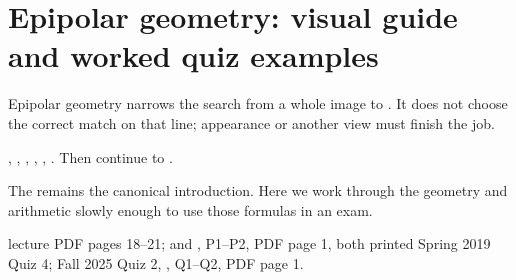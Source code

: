 \documentclass[letterpaper,11pt,english,openany,oneside]{jupyterBook}
\begin{document}
\sphinxstepscope


\section{Epipolar geometry: visual guide and worked quiz examples}
\label{\detokenize{lectures/lecture04/epipolar-practice:epipolar-geometry-visual-guide-and-worked-quiz-examples}}\label{\detokenize{lectures/lecture04/epipolar-practice:lec04-epipolar-practice}}\label{\detokenize{lectures/lecture04/epipolar-practice::doc}}
\sphinxAtStartPar
{} Epipolar geometry narrows the search from a whole image to . It does not choose the correct match on that line; appearance or another view must finish the job.

\sphinxAtStartPar
{} {\hyperref[\detokenize{lectures/lecture04/epipolar-practice:epipolar-point-line}]{}}, {\hyperref[\detokenize{lectures/lecture04/epipolar-practice:epipolar-test-match}]{}}, {\hyperref[\detokenize{lectures/lecture04/epipolar-practice:epipolar-reverse}]{}}, {\hyperref[\detokenize{lectures/lecture04/quiz-workbook:ex-lec04-symbolic}]{}}, {\hyperref[\detokenize{lectures/lecture04/quiz-workbook:ex-lec04-third-view}]{}}, {\hyperref[\detokenize{lectures/lecture04/quiz-workbook:ex-lec04-invalid-f}]{}}. Then continue to {\hyperref[\detokenize{lectures/lecture04/stereo::doc}]{}}.

\sphinxAtStartPar
The {\hyperref[\detokenize{lectures/lecture02/two-view::doc}]{}} remains the canonical introduction. Here we work through the geometry and arithmetic slowly enough to use those formulas in an exam.

\sphinxAtStartPar
{} lecture PDF pages 18–21;  and , P1–P2, PDF page 1, both printed Spring 2019 Quiz 4; Fall 2025 Quiz 2, , Q1–Q2, PDF page 1.
\end{document}
